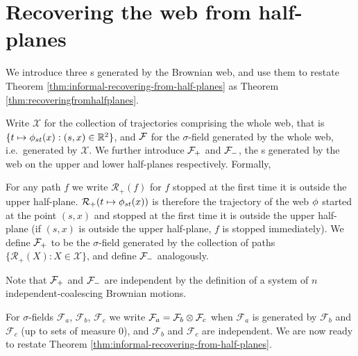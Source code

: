 \newcommand{\indepbm}{\psi}
\newcommand{\toinP}{\overset{\P}\to}
\newcommand{\statementoflemresampledetosampled}{$\resamplede \toinP \sampled$ as $\epsilon \to 0$}

\newcommand{\statewebO}{S_{\webnoargs}}
\newcommand{\statenowebO}{S_{\indepbm}}
\newcommand{\trajs}{\mathcal{X}}
{
\section{Recovering the web from half-planes}
\label{sec:recovering-from-half-planes}

We introduce three \sigfield{}s generated by the Brownian web, and use
them to restate Theorem \ref{thm:informal-recovering-from-half-planes}
as Theorem \ref{thm:recoveringfromhalfplanes}.

\newcommand{\restrictupper}{\mathcal{R}_{+}}

  Write $\trajs$ for the collection of trajectories comprising the whole web,
  that is $\{t \mapsto \phi_{{s}{t}}(x) : (s,x) \in \mathbb{R}^2\}$,
  and $\mathcal{F}$ for the $\sigma$-field generated by the
  whole web, i.e.\ generated by $\trajs$.
  We further introduce $\mathcal{F}_{+}$ and $\mathcal{F}_{-}$, the \sigfield{}s
  generated by the web on the upper and lower half-planes
  respectively.  Formally,

  \begin{definition*}
  For any path $f$ we write $\restrictupper(f)$ for $f$ stopped at the
  first time it is outside the upper half-plane.
  $\restrictupper(t \mapsto \web{s}{t}{x})$ is therefore the trajectory of the
  web $\phi$ started at the point $(s,x)$ and stopped at the first
  time it is outside the upper half-plane (if $(s,x)$ is outside the
  upper half-plane, $f$ is stopped immediately).
  We define $\mathcal{F}_{+}$ to be the $\sigma$-field generated by the
  collection of paths $\{\restrictupper(X) : X \in \trajs \}$, and define $\mathcal{F}_{-}$ analogously.
  \end{definition*}

  Note that $\mathcal{F}_{+}$ and $\mathcal{F}_{-}$ are independent by the definition of
  a system of $n$ independent-coalescing Brownian motions.

  \newcommand{\F}{\mathcal{F}}
  For $\sigma$-fields $\F_a$, $\F_b$, $\F_c$ we write $\F_a = \F_b
  \tensor \F_c$ when $\F_a$
  is generated by $\F_b$ and $\F_c$ (up to sets of measure $0$),
  and $\F_b$ and $\F_c$ are independent.
  We are now ready to restate Theorem
  \ref{thm:informal-recovering-from-half-planes}.

}
